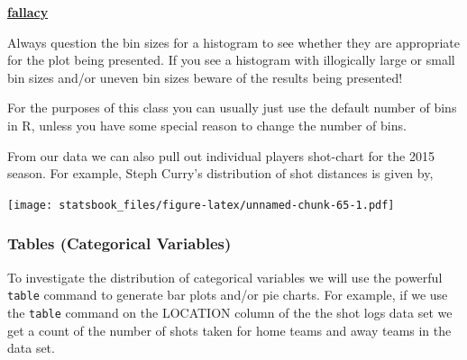 \documentclass[
]{book}
\newenvironment{Shaded}{\begin{snugshade}}{\end{snugshade}}
\newcommand{\AttributeTok}[1]{\textcolor[rgb]{0.77,0.63,0.00}{#1}}
\newcommand{\ConstantTok}[1]{\textcolor[rgb]{0.00,0.00,0.00}{#1}}
\newcommand{\DecValTok}[1]{\textcolor[rgb]{0.00,0.00,0.81}{#1}}
\newcommand{\DocumentationTok}[1]{\textcolor[rgb]{0.56,0.35,0.01}{\textbf{\textit{#1}}}}
\newcommand{\FunctionTok}[1]{\textcolor[rgb]{0.00,0.00,0.00}{#1}}
\newcommand{\NormalTok}[1]{#1}
\newcommand{\OtherTok}[1]{\textcolor[rgb]{0.56,0.35,0.01}{#1}}
\newcommand{\SpecialCharTok}[1]{\textcolor[rgb]{0.00,0.00,0.00}{#1}}
\newcommand{\StringTok}[1]{\textcolor[rgb]{0.31,0.60,0.02}{#1}}
\newenvironment{rmdblock}[1]
  {\begin{shaded*}
  \centerline{\underline{\textbf{#1}}}

  }
  {
  \end{shaded*}
  }
\newenvironment{fallacy}
  {\begin{rmdblock}{fallacy}}
  {\end{rmdblock}}
\theoremstyle{definition}
\theoremstyle{definition}
\theoremstyle{definition}
\theoremstyle{definition}
\theoremstyle{remark}
\begin{document}
\begin{fallacy}
Always question the bin sizes for a histogram to see whether they are appropriate for the plot being presented. If you see a histogram with illogically large or small bin sizes and/or uneven bin sizes beware of the results being presented!
\end{fallacy}

For the purposes of this class you can usually just use the default number of bins in R, unless you have some special reason to change the number of bins.

From our data we can also pull out individual players shot-chart for the 2015 season. For example, Steph Curry's distribution of shot distances is given by,

\begin{Shaded}
\end{Shaded}

\texttt{[image: statsbook\_files/figure-latex/unnamed-chunk-65-1.pdf]}

\hypertarget{tables-categorical-variables}{%
\subsubsection{Tables (Categorical Variables)}\label{tables-categorical-variables}}

To investigate the distribution of categorical variables we will use the powerful \texttt{table} command to generate bar plots and/or pie charts. For example, if we use the \texttt{table} command on the LOCATION column of the the shot logs data set we get a count of the number of shots taken for home teams and away teams in the data set.
\end{document}
